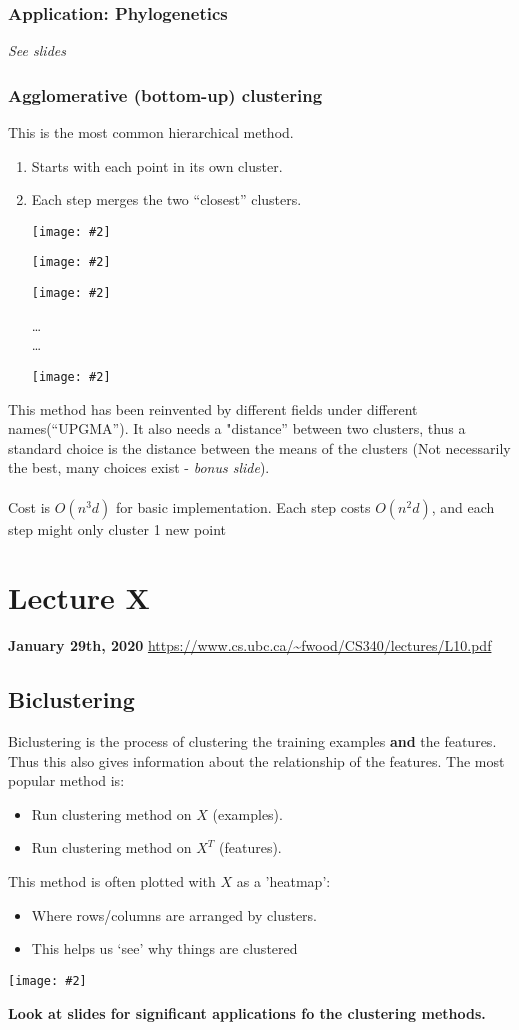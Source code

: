 \documentclass{article}
\def\blu#1{{\color{blu}#1}}
\def\gre#1{{\color{gre}#1}}
\def\red#1{{\color{red}#1}}
\theoremstyle{definition}
\newcommand{\centerfig}[2]{\begin{center}\texttt{[image: \#2]}\end{center}}
\begin{document}
\subsubsection*{Application: Phylogenetics}
\textit{See slides}

\subsubsection*{Agglomerative (bottom-up) clustering}
This is the most common hierarchical method.
\begin{enumerate}
	\item Starts with \gre{each point in its own cluster}. 
	\item Each step \gre{merges the two “closest” clusters}.
	\centerfig{0.6}{Pic9}
	\centerfig{0.6}{Pic10}
	\centerfig{0.6}{Pic11}
	\begin{center}
		\dots \\
		\dots
	\end{center}
	\centerfig{0.6}{Pic12}
\end{enumerate}
This method has been reinvented by different fields under different names(“UPGMA”). It also needs a \blu{"distance” between two clusters}, thus a standard choice is the distance between the means of the clusters (Not necessarily the best, many choices exist - \textit{bonus slide}). \\ \\
\red{Cost is $ O(n^3d) $} for basic implementation. Each step costs $ O(n^2d) $, and each step might only cluster 1 new point
\newpage

\section*{Lecture X}
\textbf{January 29th, 2020}
\url{https://www.cs.ubc.ca/~fwood/CS340/lectures/L10.pdf}

\subsection*{Biclustering}
\blu{Biclustering} is the process of \gre{clustering the training examples \textbf{and} the features}. Thus this also gives information about the relationship of the features. The most popular method is:
\begin{itemize}
	\item Run clustering method on $ X $ (examples).
	\item Run clustering method on $ X^T $ (features).
\end{itemize}
This method is often plotted with $ X $ as a 'heatmap':
\begin{itemize}
	\item Where rows/columns are arranged by clusters.
	\item This helps us ‘see’ why things are clustered
\end{itemize}
\centerfig{0.50}{Pic13}
\textbf{Look at slides for significant applications fo the clustering methods.}
\end{document}
